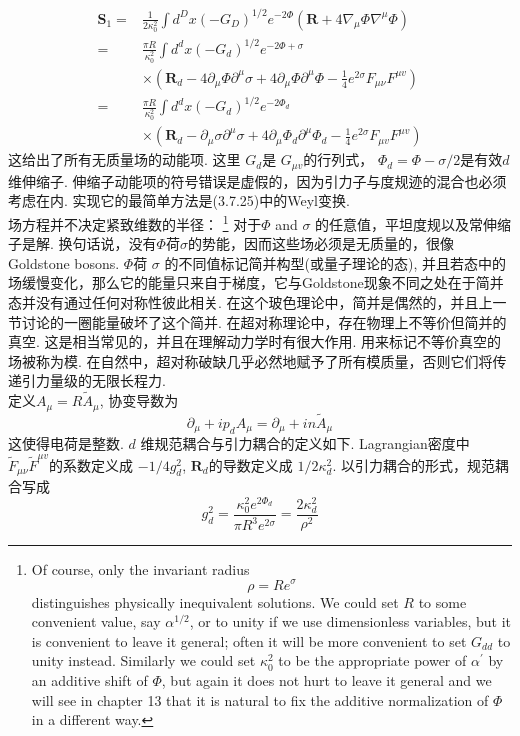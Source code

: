 \begin{equation}
	\begin{aligned}
		\boldsymbol{S}_{1}=& \frac{1}{2 \kappa_{0}^{2}} \int d^{D} x\left(-G_{D}\right)^{1 / 2} e^{-2 \Phi}\left(\boldsymbol{R}+4 \nabla_{\mu} \Phi \nabla^{\mu} \Phi\right) \\
		=& \frac{\pi R}{\kappa_{0}^{2}} \int d^{d} x\left(-G_{d}\right)^{1 / 2} e^{-2 \Phi+\sigma} \\
		& \times\left(\boldsymbol{R}_{d}-4 \partial_{\mu} \Phi \partial^{\mu} \sigma+4 \partial_{\mu} \Phi \partial^{\mu} \Phi-\frac{1}{4} e^{2 \sigma} F_{\mu \nu} F^{\mu v}\right) \\
		=& \frac{\pi R}{\kappa_{0}^{2}} \int  d^{d} x\left(-G_{d}\right)^{1 / 2} e^{-2 \Phi_{d}} \\
		& \times\left(\boldsymbol{R}_{d}-\partial_{\mu} \sigma \partial^{\mu} \sigma+4 \partial_{\mu} \Phi_{d} \partial^{\mu} \Phi_{d}-\frac{1}{4} e^{2 \sigma} F_{\mu v} F^{\mu v}\right)
	\end{aligned}
\end{equation}
这给出了所有无质量场的动能项. 这里 $G_{d}$是 $G_{\mu v}$的行列式，  $\Phi_{d}=\Phi-\sigma / 2$是有效$d$维伸缩子. 伸缩子动能项的符号错误是虚假的，因为引力子与度规迹的混合也必须考虑在内. 实现它的最简单方法是(3.7.25)中的Weyl变换.\\
场方程并不决定紧致维数的半径：
\footnote{Of course, only the invariant radius
	$$\rho=R e^{\sigma}$$
distinguishes physically inequivalent solutions. We could set $R$ to some convenient value, say $\alpha^{1 / 2}$, or to unity if we use dimensionless variables, but it is convenient to leave it general; often it will be more convenient to set $G_{d d}$ to unity instead. Similarly we could set $\kappa_{0}^{2}$ to be the appropriate power of $\alpha^{\prime}$ by an additive shift of $\Phi$, but again it does not hurt to leave it general and we will see in chapter 13 that it is natural to fix the additive normalization of $\Phi$ in a different way.}
对于$\Phi$ and $\sigma $ 的任意值，平坦度规以及常伸缩子是解. 换句话说，没有$\Phi$荷$\sigma$的势能，因而这些场必须是无质量的，很像Goldstone bosons. $\Phi$荷 $\sigma$ 的不同值标记简并构型(或量子理论的态), 并且若态中的场缓慢变化，那么它的能量只来自于梯度，它与Goldstone现象不同之处在于简并态并没有通过任何对称性彼此相关. 在这个玻色理论中，简并是偶然的，并且上一节讨论的一圈能量破坏了这个简并. 在超对称理论中，存在物理上不等价但简并的真空. 这是相当常见的，并且在理解动力学时有很大作用. 用来标记不等价真空的场被称为模. 在自然中，超对称破缺几乎必然地赋予了所有模质量，否则它们将传递引力量级的无限长程力.\\
定义$A_{\mu}=R \tilde{A}_{\mu}$, 协变导数为
\begin{equation}
	\partial_{\mu}+i p_{d} A_{\mu}=\partial_{\mu}+i n \tilde{A}_{\mu}
\end{equation}
这使得电荷是整数.  $d$ 维规范耦合与引力耦合的定义如下. Lagrangian密度中 $\tilde{F}_{\mu \nu} \tilde{F}^{\mu v}$的系数定义成 $-1 / 4 g_{d}^{2}$,  $\boldsymbol{R}_{d}$的导数定义成 $1 / 2 \kappa_{d}^{2}$. 以引力耦合的形式，规范耦合写成
\begin{equation}
	g_{d}^{2}=\frac{\kappa_{0}^{2} e^{2 \Phi_{d}}}{\pi R^{3} e^{2 \sigma}}=\frac{2 \kappa_{d}^{2}}{\rho^{2}}
\end{equation}

